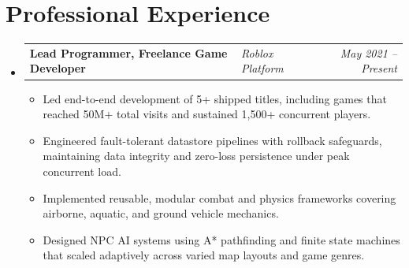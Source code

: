 \documentclass[10pt, letterpaper]{article}
\makeatletter
\newcommand{\resumeSubheading}[3]{%
    \item
    \begin{tabularx}{\textwidth}{@{}l X r@{}}
        \textbf{#1} & \textit{\small #2} & \textit{\small #3}
    \end{tabularx}%
}
\makeatother
\begin{document}
\section*{Professional Experience}
\begin{itemize}
    \resumeSubheading
        {Lead Programmer, Freelance Game Developer}
        {Roblox Platform}
        {May 2021 -- Present}
    \begin{itemize}
        \item Led end-to-end development of 5+ shipped titles, including games that reached 50M+ total visits and sustained 1,500+ concurrent players.
        \item Engineered fault-tolerant datastore pipelines with rollback safeguards, maintaining data integrity and zero-loss persistence under peak concurrent load.
        \item Implemented reusable, modular combat and physics frameworks covering airborne, aquatic, and ground vehicle mechanics.
        \item Designed NPC AI systems using A* pathfinding and finite state machines that scaled adaptively across varied map layouts and game genres.
    \end{itemize}
\end{itemize}

\end{document}
